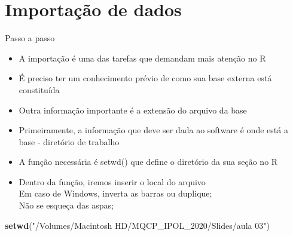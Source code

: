 \documentclass[
  10pt,
  ignorenonframetext,
]{beamer}
\newenvironment{Shaded}{\begin{snugshade}}{\end{snugshade}}
\newcommand{\KeywordTok}[1]{\textcolor[rgb]{0.13,0.29,0.53}{\textbf{#1}}}
\newcommand{\NormalTok}[1]{#1}
\newcommand{\StringTok}[1]{\textcolor[rgb]{0.31,0.60,0.02}{#1}}
\providecommand{\tightlist}{%
  \setlength{\itemsep}{0pt}\setlength{\parskip}{0pt}}
\begin{document}
\hypertarget{importauxe7uxe3o-de-dados}{%
\section{Importação de dados}\label{importauxe7uxe3o-de-dados}}

\begin{frame}[fragile]{Passo a passo}
\protect\hypertarget{passo-a-passo}{}
\begin{itemize}
\tightlist
\item
  A importação é uma das tarefas que demandam mais atenção no R
\item
  É preciso ter um conhecimento prévio de como sua base externa está
  constituída
\item
  Outra informação importante é a extensão do arquivo da base
\item
  Primeiramente, a informação que deve ser dada ao software é onde está
  a base - diretório de trabalho
\item
  A função necessária é setwd() que define o diretório da sua seção no R
\item
  Dentro da função, iremos inserir o local do arquivo\\
  Em caso de Windows, inverta as barras ou duplique;\\
  Não se esqueça das aspas;
\end{itemize}

\begin{Shaded}
\begin{Highlighting}[]
\KeywordTok{setwd}\NormalTok{(}\StringTok{"/Volumes/Macintosh HD/MQCP\_IPOL\_2020/Slides/aula 03"}\NormalTok{)}
\end{Highlighting}
\end{Shaded}
\end{frame}
\end{document}
